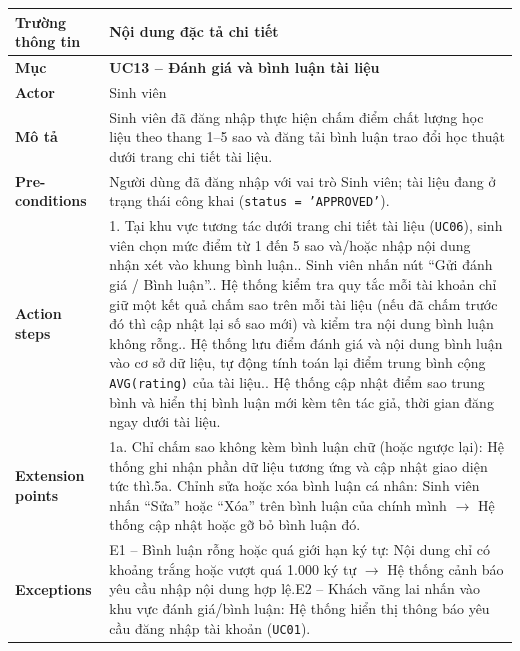 \begin{table}[H]
\centering
\footnotesize\linespread{1.05}\selectfont
\setlength{\tabcolsep}{5pt}
\renewcommand{\arraystretch}{1.12}
\begin{tabularx}{\textwidth}{|p{3.5cm}|X|}
\hline
\rowcolor[HTML]{EAEAEA}
\textbf{Trường thông tin} & \textbf{Nội dung đặc tả chi tiết} \\
\hline
\textbf{Mục} & \textbf{UC13 -- Đánh giá và bình luận tài liệu} \\
\hline
\textbf{Actor} & Sinh viên \\
\hline
\textbf{Mô tả} & Sinh viên đã đăng nhập thực hiện chấm điểm chất lượng học liệu theo thang 1--5 sao và đăng tải bình luận trao đổi học thuật dưới trang chi tiết tài liệu. \\
\hline
\textbf{Pre-conditions} & Người dùng đã đăng nhập với vai trò Sinh viên; tài liệu đang ở trạng thái công khai (\texttt{status = 'APPROVED'}). \\
\hline
\textbf{Action steps} & 1. Tại khu vực tương tác dưới trang chi tiết tài liệu (\texttt{UC06}), sinh viên chọn mức điểm từ 1 đến 5 sao và/hoặc nhập nội dung nhận xét vào khung bình luận.\newline 2. Sinh viên nhấn nút ``Gửi đánh giá / Bình luận''.\newline 3. Hệ thống kiểm tra quy tắc mỗi tài khoản chỉ giữ một kết quả chấm sao trên mỗi tài liệu (nếu đã chấm trước đó thì cập nhật lại số sao mới) và kiểm tra nội dung bình luận không rỗng.\newline 4. Hệ thống lưu điểm đánh giá và nội dung bình luận vào cơ sở dữ liệu, tự động tính toán lại điểm trung bình cộng \texttt{AVG(rating)} của tài liệu.\newline 5. Hệ thống cập nhật điểm sao trung bình và hiển thị bình luận mới kèm tên tác giả, thời gian đăng ngay dưới tài liệu. \\
\hline
\textbf{Extension points} & 1a. Chỉ chấm sao không kèm bình luận chữ (hoặc ngược lại): Hệ thống ghi nhận phần dữ liệu tương ứng và cập nhật giao diện tức thì.\newline 5a. Chỉnh sửa hoặc xóa bình luận cá nhân: Sinh viên nhấn ``Sửa'' hoặc ``Xóa'' trên bình luận của chính mình $\rightarrow$ Hệ thống cập nhật hoặc gỡ bỏ bình luận đó. \\
\hline
\textbf{Exceptions} & E1 -- Bình luận rỗng hoặc quá giới hạn ký tự: Nội dung chỉ có khoảng trắng hoặc vượt quá 1.000 ký tự $\rightarrow$ Hệ thống cảnh báo yêu cầu nhập nội dung hợp lệ.\newline E2 -- Khách vãng lai nhấn vào khu vực đánh giá/bình luận: Hệ thống hiển thị thông báo yêu cầu đăng nhập tài khoản (\texttt{UC01}). \\

\end{tabularx}
\end{table}

